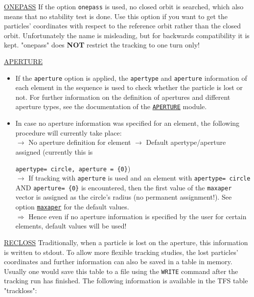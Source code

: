 \href{track:remarks:onepass:notes}{ONEPASS}
If the option \texttt{onepass} is used, no closed orbit is searched,
which also means that no stability test is done. Use this option if you
want to get the particles' coordinates with respect to the reference
orbit rather than the closed orbit. Unfortunately the name is
misleading, but for backwards compatibility it is kept. "onepass" does
\textbf{NOT} restrict the tracking to one turn only! 
          
\href{track:remarks:aperture:notes}{APERTURE}
\begin{itemize}
    \item If the \texttt{aperture} option is applied, the \texttt{apertype} 
      and \texttt{aperture} information of each element in the sequence
      is used to check whether the particle is lost or not. For further
      information on the definition of apertures and different aperture
      types, see the documentation of the
      \href{../Introduction/aperture.html}{\texttt{APERTURE}} module. 
      
    \item In case no aperture information was specified for an element, 
      the following procedure will currently take place:
      \\
      $\rightarrow$ No aperture definition for element $\rightarrow$ 
      Default apertype/aperture assigned (currently this is 
      
      \texttt{apertype= circle, aperture = \{0\}}) 
      \\ $\rightarrow$  
      If tracking with \texttt{aperture} is used and an
      element with 
      \texttt{apertype= circle} AND 
      \texttt{aperture= \{0\}} 
      is encountered, then the first value of the \texttt{maxaper} vector
      is assigned as the circle's radius (no permanent assignment!). 
      See option \hyperlink{run}{\texttt{maxaper}} for 
      the default values. 
      \\ $\Rightarrow$
      Hence even if no aperture information is specified by the user for
      certain elements, default values will be used! 
\end{itemize}
          
\href{track:remarks:recloss:notes}{RECLOSS}
Traditionally, when a particle is lost on the aperture, this information
is written to stdout. To allow more flexible tracking studies, the lost
particles' coordinates and further information can also be saved in a
table in memory. Usually one would save this table to a file using the
\texttt{WRITE} command after the tracking run has finished. The
following information is available in the TFS table "trackloss": 
          
